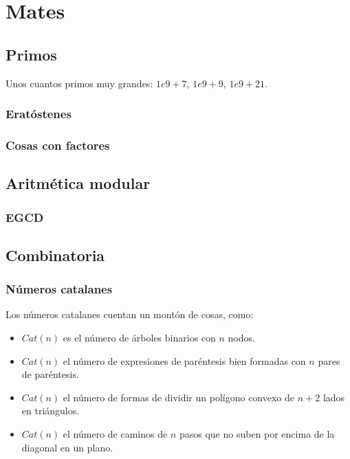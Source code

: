 \chapter{Mates}
\section{Primos}
Unos cuantos primos muy grandes: $1e9 + 7$, $1e9 + 9$, $1e9 + 21$.

\subsection{Eratóstenes}

\subsection{Cosas con factores}

\section{Aritmética modular}
\subsection{EGCD}


\section{Combinatoria}
\subsection{Números catalanes}
Los números catalanes cuentan un montón de cosas, como:
\begin{itemize}
    \item $Cat(n)$ es el número de árboles binarios con $n$ nodos.

    \item $Cat(n)$ el número de expresiones de paréntesis bien formadas con $n$
    pares de paréntesis.

    \item $Cat(n)$ el número de formas de dividir un polígono convexo de $n+2$
    lados en triángulos.

    \item $Cat(n)$ el número de caminos de $n$ pasos que no suben por encima de
    la diagonal en un plano.
\end{itemize}

